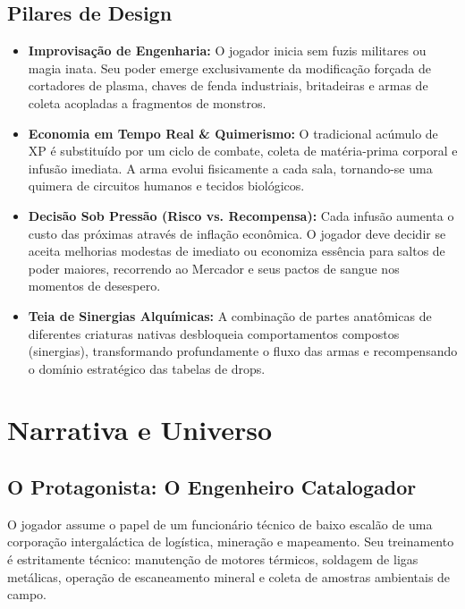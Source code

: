 \documentclass[a4paper,12pt]{report}
\begin{document}
\section{Pilares de Design}
\begin{itemize}
    \item \textbf{Improvisação de Engenharia:} O jogador inicia sem fuzis militares ou magia inata. Seu poder emerge exclusivamente da modificação forçada de cortadores de plasma, chaves de fenda industriais, britadeiras e armas de coleta acopladas a fragmentos de monstros.
    \item \textbf{Economia em Tempo Real \& Quimerismo:} O tradicional acúmulo de XP é substituído por um ciclo de combate, coleta de matéria-prima corporal e infusão imediata. A arma evolui fisicamente a cada sala, tornando-se uma quimera de circuitos humanos e tecidos biológicos.
    \item \textbf{Decisão Sob Pressão (Risco vs. Recompensa):} Cada infusão aumenta o custo das próximas através de inflação econômica. O jogador deve decidir se aceita melhorias modestas de imediato ou economiza essência para saltos de poder maiores, recorrendo ao Mercador e seus pactos de sangue nos momentos de desespero.
    \item \textbf{Teia de Sinergias Alquímicas:} A combinação de partes anatômicas de diferentes criaturas nativas desbloqueia comportamentos compostos (sinergias), transformando profundamente o fluxo das armas e recompensando o domínio estratégico das tabelas de drops.
\end{itemize}

\chapter{Narrativa e Universo}

\section{O Protagonista: O Engenheiro Catalogador}
O jogador assume o papel de um funcionário técnico de baixo escalão de uma corporação intergaláctica de logística, mineração e mapeamento. Seu treinamento é estritamente técnico: manutenção de motores térmicos, soldagem de ligas metálicas, operação de escaneamento mineral e coleta de amostras ambientais de campo.
\end{document}
